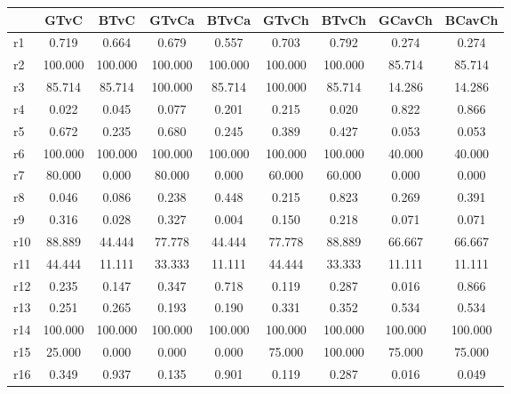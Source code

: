 \begin{table}[htbp]
\begin{tabular}{lcccccccc} \hline \hline
 & GTvC  & BTvC  & GTvCa  & BTvCa  & GTvCh  & BTvCh  & GCavCh  & BCavCh  \\  \hline 
r1 &     0.719 &     0.664 &     0.679 &     0.557 &     0.703 &     0.792 &     0.274 &     0.274 \\  
r2 &   100.000 &   100.000 &   100.000 &   100.000 &   100.000 &   100.000 &    85.714 &    85.714 \\  
r3 &    85.714 &    85.714 &   100.000 &    85.714 &   100.000 &    85.714 &    14.286 &    14.286 \\  
r4 &     0.022 &     0.045 &     0.077 &     0.201 &     0.215 &     0.020 &     0.822 &     0.866 \\  
r5 &     0.672 &     0.235 &     0.680 &     0.245 &     0.389 &     0.427 &     0.053 &     0.053 \\  
r6 &   100.000 &   100.000 &   100.000 &   100.000 &   100.000 &   100.000 &    40.000 &    40.000 \\  
r7 &    80.000 &     0.000 &    80.000 &     0.000 &    60.000 &    60.000 &     0.000 &     0.000 \\  
r8 &     0.046 &     0.086 &     0.238 &     0.448 &     0.215 &     0.823 &     0.269 &     0.391 \\  
r9 &     0.316 &     0.028 &     0.327 &     0.004 &     0.150 &     0.218 &     0.071 &     0.071 \\  
r10 &    88.889 &    44.444 &    77.778 &    44.444 &    77.778 &    88.889 &    66.667 &    66.667 \\  
r11 &    44.444 &    11.111 &    33.333 &    11.111 &    44.444 &    33.333 &    11.111 &    11.111 \\  
r12 &     0.235 &     0.147 &     0.347 &     0.718 &     0.119 &     0.287 &     0.016 &     0.866 \\  
r13 &     0.251 &     0.265 &     0.193 &     0.190 &     0.331 &     0.352 &     0.534 &     0.534 \\  
r14 &   100.000 &   100.000 &   100.000 &   100.000 &   100.000 &   100.000 &   100.000 &   100.000 \\  
r15 &    25.000 &     0.000 &     0.000 &     0.000 &    75.000 &   100.000 &    75.000 &    75.000 \\  
r16 &     0.349 &     0.937 &     0.135 &     0.901 &     0.119 &     0.287 &     0.016 &     0.049 \\  

\end{tabular}
\end{table}
